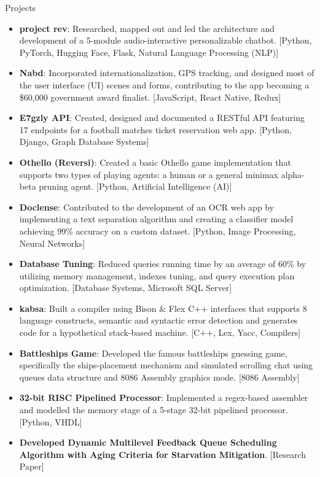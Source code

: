 \documentclass[]{mcdowellcv}
\begin{document}
	\begin{cvsection}{Projects}
		\begin{cvsubsection}{}{}{}
			\begin{itemize}
				\item \textbf{project rev}: Researched, mapped out and led the architecture and development of a 5-module audio-interactive personalizable chatbot. [Python, PyTorch, Hugging Face, Flask, Natural Language Processing (NLP)]
				\item \textbf{Nabd}: Incorporated internationalization, GPS tracking, and designed most of the user interface (UI) scenes and forms, contributing to the app becoming a \$60,000 government award finalist. [JavaScript, React Native, Redux]
				\item \textbf{E7gzly API}: Created, designed and documented a RESTful API featuring 17 endpoints for a football matches ticket reservation web app. [Python, Django, Graph Database Systems]
				\item \textbf{Othello (Reversi)}: Created a basic Othello game implementation that supports two types of playing agents: a human or a general minimax alpha-beta pruning agent. [Python, Artificial Intelligence (AI)]
				\item \textbf{Doclense}: Contributed to the development of an OCR web app by implementing a text separation algorithm and creating a classifier model achieving 99\% accuracy on a custom dataset. [Python, Image Processing, Neural Networks]
				\item \textbf{Database Tuning}: Reduced queries running time by an average of 60\% by utilizing memory management, indexes tuning, and query execution plan optimization. [Database Systems, Microsoft SQL Server]
				\item \textbf{kabsa}: Built a compiler using Bison \& Flex C++ interfaces that supports 8 language constructs, semantic and syntactic error detection and generates code for a hypothetical stack-based machine. [C++, Lex, Yacc, Compilers]
				\item \textbf{Battleships Game}: Developed the famous battleships guessing game, specifically the ships-placement mechanism and simulated scrolling chat using queues data structure and 8086 Assembly graphics mode. [8086 Assembly]
				\item \textbf{32-bit RISC Pipelined Processor}: Implemented a regex-based assembler and modelled the memory stage of a 5-stage 32-bit pipelined processor. [Python, VHDL]
				\item \textbf{Developed Dynamic Multilevel Feedback Queue Scheduling Algorithm with Aging Criteria for Starvation Mitigation}. [Research Paper]
			\end{itemize}
		\end{cvsubsection}
	\end{cvsection}
\end{document}
